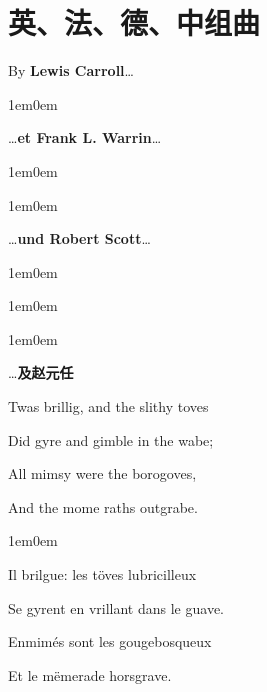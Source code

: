 \documentclass[
  12pt,
  twoside,
  openright,
  oldfontcommands,
]{memoir}
\begin{document}
\label{Dialog12.xhtml}{}

\chapter*{英、法、德、中组曲}

By \textbf{Lewis Carroll}\ldots{}

\begin{adjustwidth}{1em}{0em}

\ldots{}\textbf{et Frank L. Warrin}\ldots{}

\end{adjustwidth}

\begin{adjustwidth}{1em}{0em}

\begin{adjustwidth}{1em}{0em}

\ldots{}\textbf{und Robert Scott}\ldots{}

\end{adjustwidth}

\end{adjustwidth}

\begin{adjustwidth}{1em}{0em}

\begin{adjustwidth}{1em}{0em}

\begin{adjustwidth}{1em}{0em}

\ldots{}\textbf{及赵元任}

\end{adjustwidth}

\end{adjustwidth}

\end{adjustwidth}

\hfill\break

\textquotesingle Twas brillig, and the slithy toves

Did gyre and gimble in the wabe;

All mimsy were the borogoves,

And the mome raths outgrabe.

\hfill\break

\begin{adjustwidth}{1em}{0em}

Il brilgue: les töves lubricilleux

Se gyrent en vrillant dans le guave.

Enmimés sont les gougebosqueux

Et le mëmerade horsgrave.

\end{adjustwidth}
\end{document}
